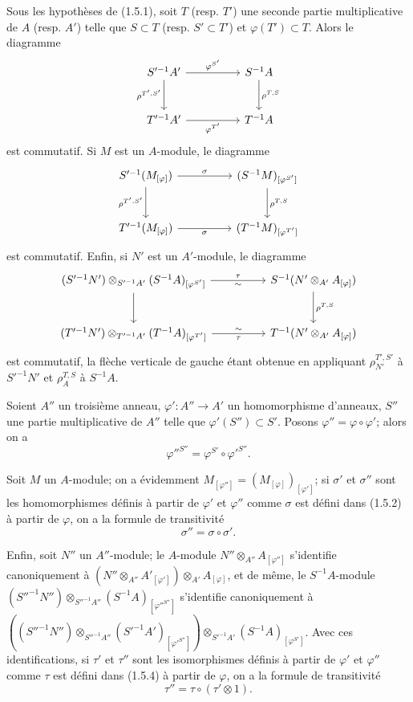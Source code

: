 \begin{env}[1.5.6]
\label{0.1.5.6-fr}
Sous les hypothèses de (1.5.1), soit $T$ (resp. $T'$) une seconde partie
multiplicative de $A$ (resp. $A'$) telle que $S\subset T$ (resp. $S'\subset T'$)
et $\varphi(T')\subset T$. Alors le diagramme
\[
\begin{tikzcd}[column sep=huge,row sep=large]
S'^{-1}A' \arrow[r,"\varphi^{S'}"] \arrow[d,"\rho^{T',S'}"']
  & S^{-1}A \arrow[d,"\rho^{T,S}"] \\
T'^{-1}A' \arrow[r,"\varphi^{T'}"']
  & T^{-1}A
\end{tikzcd}
\]
est commutatif. Si $M$ est un $A$-module, le diagramme
\[
\begin{tikzcd}[column sep=huge,row sep=large]
S'^{-1}(M_{[\varphi]}) \arrow[r,"\sigma"] \arrow[d,"\rho^{T',S'}"']
  & (S^{-1}M)_{[\varphi^{S'}]} \arrow[d,"\rho^{T,S}"] \\
T'^{-1}(M_{[\varphi]}) \arrow[r,"\sigma"']
  & (T^{-1}M)_{[\varphi^{T'}]}
\end{tikzcd}
\]
est commutatif. Enfin, si $N'$ est un $A'$-module, le diagramme
\[
\begin{tikzcd}[column sep=huge,row sep=large]
(S'^{-1}N')\otimes_{S'^{-1}A'}(S^{-1}A)_{[\varphi^{S'}]}
  \arrow[r,"\tau","{\sim}"'] \arrow[d]
  & S^{-1}(N'\otimes_{A'}A_{[\varphi]}) \arrow[d,"\rho^{T,S}"] \\
(T'^{-1}N')\otimes_{T'^{-1}A'}(T^{-1}A)_{[\varphi^{T'}]}
  \arrow[r,"\tau"',"{\sim}"]
  & T^{-1}(N'\otimes_{A'}A_{[\varphi]})
\end{tikzcd}
\]
est commutatif, la flèche verticale de gauche étant obtenue en appliquant
$\rho_{N'}^{T',S'}$ à $S'^{-1}N'$ et $\rho_A^{T,S}$ à $S^{-1}A$.
\end{env}


\begin{env}[1.5.7]
\label{0.1.5.7-fr}
Soient $A''$ un troisième anneau, $\varphi':A''\to A'$ un homomorphisme
d'anneaux, $S''$ une partie multiplicative de $A''$ telle que
$\varphi'(S'')\subset S'$. Posons $\varphi''=\varphi\circ\varphi'$; alors on a
\[
  \varphi''^{S''}=\varphi^{S'}\circ\varphi'^{S''}.
\]

Soit $M$ un $A$-module; on a évidemment
$M_{[\varphi'']}=(M_{[\varphi]})_{[\varphi']}$; si $\sigma'$ et $\sigma''$ sont
les homomorphismes définis à partir de $\varphi'$ et $\varphi''$ comme $\sigma$
est défini dans (1.5.2) à partir de $\varphi$, on a la formule de transitivité
\[
  \sigma''=\sigma\circ\sigma'.
\]

Enfin, soit $N''$ un $A''$-module; le $A$-module
$N''\otimes_{A''}A_{[\varphi'']}$ s'identifie canoniquement à
$(N''\otimes_{A''}A'_{[\varphi']})\otimes_{A'}A_{[\varphi]}$,
et de même, le $S^{-1}A$-module
$(S''^{-1}N'')\otimes_{S''^{-1}A''}(S^{-1}A)_{[\varphi''^{S''}]}$
s'identifie canoniquement à
$((S''^{-1}N'')\otimes_{S''^{-1}A''}(S'^{-1}A')_{[\varphi'^{S''}]})\otimes_{S'^{-1}A'}(S^{-1}A)_{[\varphi^{S'}]}$.
Avec ces identifications, si $\tau'$ et $\tau''$ sont les isomorphismes définis
à partir de $\varphi'$ et $\varphi''$ comme $\tau$ est défini dans (1.5.4) à
partir de $\varphi$, on a la formule de transitivité
\[
  \tau''=\tau\circ(\tau'\otimes 1).
\]
\end{env}

